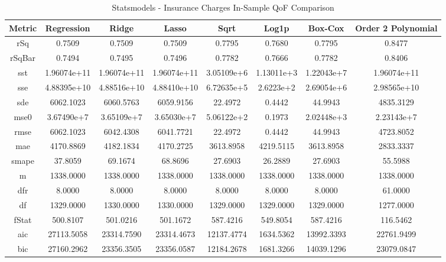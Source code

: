 \documentclass{article}
\begin{document}
\begin{table}[H]
\centering
\caption{Statsmodels - Insurance Charges In-Sample QoF Comparison}
\label{tab:Statsmodels - Insurance Charges In-Sample QoF Comparison}
\begin{tabular}{|c|c|c|c|c|c|c|c|}\hline
Metric & Regression & Ridge & Lasso & Sqrt & Log1p & Box-Cox & Order 2 Polynomial \\ \hline \hline
rSq & 0.7509 & 0.7509 & 0.7509 & 0.7795 & 0.7680 & 0.7795 & 0.8477 \\ \hline
rSqBar & 0.7494 & 0.7495 & 0.7496 & 0.7782 & 0.7666 & 0.7782 & 0.8406 \\ \hline
sst & 1.96074e+11 & 1.96074e+11 & 1.96074e+11 & 3.05109e+6 & 1.13011e+3 & 1.22043e+7 & 1.96074e+11 \\ \hline
sse & 4.88395e+10 & 4.88516e+10 & 4.88410e+10 & 6.72635e+5 & 2.6223e+2 & 2.69054e+6 & 2.98565e+10 \\ \hline
sde & 6062.1023 & 6060.5763 & 6059.9156 & 22.4972 & 0.4442 & 44.9943 & 4835.3129 \\ \hline
mse0 & 3.67490e+7 & 3.65109e+7 & 3.65030e+7 & 5.06122e+2 & 0.1973 & 2.02448e+3 & 2.23143e+7 \\ \hline
rmse & 6062.1023 & 6042.4308 & 6041.7721 & 22.4972 & 0.4442 & 44.9943 & 4723.8052 \\ \hline
mae & 4170.8869 & 4182.1834 & 4170.2725 & 3613.8958 & 4219.5115 & 3613.8958 & 2833.3337 \\ \hline
smape & 37.8059 & 69.1674 & 68.8696 & 27.6903 & 26.2889 & 27.6903 & 55.5988 \\ \hline
m & 1338.0000 & 1338.0000 & 1338.0000 & 1338.0000 & 1338.0000 & 1338.0000 & 1338.0000 \\ \hline
dfr & 8.0000 & 8.0000 & 8.0000 & 8.0000 & 8.0000 & 8.0000 & 61.0000 \\ \hline
df & 1329.0000 & 1330.0000 & 1330.0000 & 1329.0000 & 1329.0000 & 1329.0000 & 1277.0000 \\ \hline
fStat & 500.8107 & 501.0216 & 501.1672 & 587.4216 & 549.8054 & 587.4216 & 116.5462 \\ \hline
aic & 27113.5058 & 23314.7590 & 23314.4673 & 12137.4774 & 1634.5362 & 13992.3393 & 22761.9499 \\ \hline
bic & 27160.2962 & 23356.3505 & 23356.0587 & 12184.2678 & 1681.3266 & 14039.1296 & 23079.0847 \\ \hline
\end{tabular}
\end{table}
\end{document}
